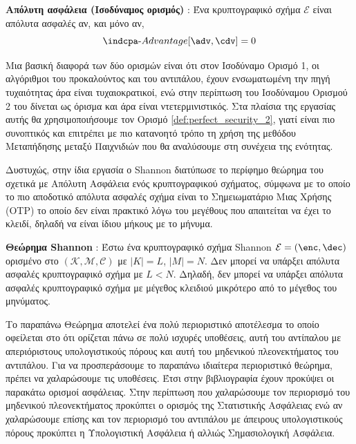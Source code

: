 \begin{definition}
\label{def:perfect_security_2}
\textbf{Απόλυτη ασφάλεια (Ισοδύναμος ορισμός)} : Ένα κρυπτογραφικό σχήμα $\mathcal{E}$ είναι απόλυτα ασφαλές αν, και μόνο αν, 
$$\indcpa\text{-}Advantage[\adv, \cdv] = 0$$
\end{definition}

Μια βασική διαφορά των δύο ορισμών είναι ότι στον Ισοδύναμο Ορισμό 1, οι αλγόριθμοι του προκαλούντος και του αντιπάλου, έχουν ενσωματωμένη την πηγή τυχαιότητας άρα είναι τυχαιοκρατικοί, ενώ στην περίπτωση του Ισοδύναμου Ορισμού 2 του δίνεται ως όρισμα και άρα είναι ντετερμινιστικός. Στα πλαίσια της εργασίας αυτής θα χρησιμοποιήσουμε τον Ορισμό \ref{def:perfect_security_2}, γιατί είναι πιο συνοπτικός και επιτρέπει με πιο κατανοητό τρόπο τη χρήση της μεθόδου Μεταπήδησης μεταξύ Παιχνιδιών που θα αναλύσουμε στη συνέχεια της ενότητας.

Δυστυχώς, στην ίδια εργασία \cite{shannon1945mathematical} ο Shannon διατύπωσε το περίφημο θεώρημα του σχετικά με Απόλυτη Ασφάλεια ενός κρυπτογραφικού σχήματος, σύμφωνα με το οποίο το πιο αποδοτικό απόλυτα ασφαλές σχήμα είναι το Σημειωματάριο Μιας Χρήσης (OTP) το οποίο δεν είναι πρακτικό λόγω του μεγέθους που απαιτείται να έχει το κλειδί, δηλαδή να είναι ίδιου μήκους με το μήνυμα.


\begin{definition}
\label{shannon_theorem}
\textbf{Θεώρημα Shannon} : Έστω ένα κρυπτογραφικό σχήμα Shannon $\mathcal{E}=(\enc, \dec)$ ορισμένο στο $(\mathcal{K},\mathcal{M},\mathcal{C})$ με $|Κ|=L$, $|M|=N$. Δεν μπορεί να υπάρξει απόλυτα ασφαλές κρυπτογραφικό σχήμα με $L < N$. Δηλαδή, δεν μπορεί να υπάρξει απόλυτα ασφαλές κρυπτογραφικό σχήμα με μέγεθος κλειδιού μικρότερο από το μέγεθος του μηνύματος.
\end{definition}

Το παραπάνω Θεώρημα αποτελεί ένα πολύ περιοριστικό αποτέλεσμα το οποίο οφείλεται στο ότι ορίζεται πάνω σε πολύ ισχυρές υποθέσεις, αυτή του αντίπαλου με απεριόριστους υπολογιστικούς πόρους και αυτή του μηδενικού πλεονεκτήματος του αντιπάλου. Για να προσπεράσουμε το παραπάνω ιδιαίτερα περιοριστικό θεώρημα, πρέπει να χαλαρώσουμε τις υποθέσεις. Έτσι στην βιβλιογραφία έχουν προκύψει οι παρακάτω ορισμοί ασφάλειας. Στην περίπτωση που χαλαρώσουμε τον περιορισμό του μηδενικού πλεονεκτήματος προκύπτει ο ορισμός της Στατιστικής Ασφάλειας ενώ αν χαλαρώσουμε επίσης και τον περιορισμό του αντιπάλου με άπειρους υπολογιστικούς πόρους προκύπτει η Υπολογιστική Ασφάλεια ή αλλιώς Σημασιολογική Ασφάλεια.

